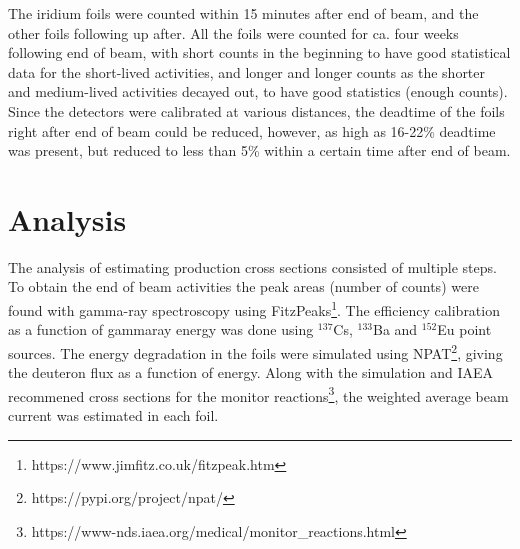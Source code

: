 \documentclass[a4paper,11pt,twoside]{book}
\begin{document}
\noindent 
The iridium foils were counted within 15 minutes after end of beam, and the other foils following up after. All the foils were counted for ca. four weeks following end of beam, with short counts in the beginning to have good statistical data for the short-lived activities, and longer and longer counts as the shorter and medium-lived activities decayed out, to have good statistics (enough counts). Since the detectors were calibrated at various distances, the deadtime of the foils right after end of beam could be reduced, however, as high as  16-22\% deadtime was present, but reduced to less than 5\% within a certain time after end of beam. 

\chapter{Analysis}




The analysis of estimating production cross sections consisted of multiple steps. To obtain the end of beam activities the peak areas (number of counts) were found with gamma-ray spectroscopy using FitzPeaks\footnote{https://www.jimfitz.co.uk/fitzpeak.htm}. The efficiency calibration as a function of gammaray energy was done using $^{137}$Cs, $^{133}$Ba and $^{152}$Eu point sources. The energy degradation in the foils were simulated using NPAT\footnote{https://pypi.org/project/npat/}, giving the deuteron flux as a function of energy. Along with the simulation and IAEA recommened cross sections for the monitor reactions\footnote{https://www-nds.iaea.org/medical/monitor_reactions.html}, the weighted average beam current was estimated in each foil. 
\end{document}
